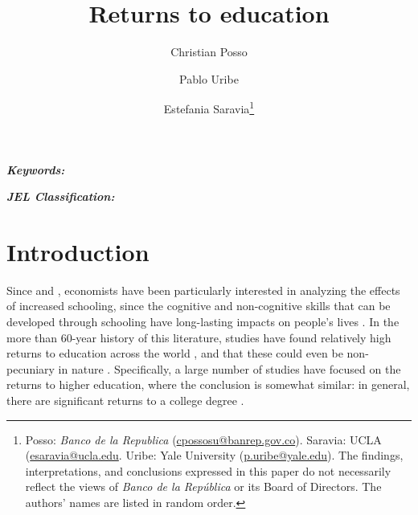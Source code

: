 \documentclass[12pt, a4paper]{article}
\begin{document}
\renewcommand{\BOthers}[1]{et al.\hbox{}}
\newcommand\fnote[1]{\captionsetup{font=small}\caption*{#1}}

\title{\Large \textbf{Returns to education} \vspace{-0.1cm}}
\author{Christian Posso \and Pablo Uribe \and Estefania Saravia\thanks{Posso: \textit{Banco de la Republica} (\href{mailto:cpossosu@banrep.gov.co}{cpossosu@banrep.gov.co}). Saravia: UCLA (\href{mailto:esaravia@ucla.edu}{esaravia@ucla.edu}. Uribe: Yale University (\href{mailto:p.uribe@yale.edu}{p.uribe@yale.edu}). The findings, interpretations, and conclusions expressed in this paper do not necessarily reflect the views of \textit{Banco de la República} or its Board of Directors. The authors’ names are listed in random order.}}
\maketitle

\vspace{-0.5cm}
\begin{abstract}
    
\end{abstract}



\textit{\textbf{Keywords:}} 



\textit{\textbf{JEL Classification:}}

\vspace{.5cm}

\newpage
\section{Introduction}

Since \citet{becker1962investment} and \citet{mincer1974schooling}, economists have been particularly interested in analyzing the effects of increased schooling, since the cognitive and non-cognitive skills that can be developed through schooling have long-lasting impacts on people's lives \citep{heckman2006effects}. In the more than 60-year history of this literature, studies have found relatively high returns to education across the world \citep{psacharopoulos2018returns}, and that these could even be non-pecuniary in nature \citep{oreopoulos2011priceless}. Specifically, a large number of studies have focused on the returns to higher education, where the conclusion is somewhat similar: in general, there are significant returns to a college degree \citep{oreopoulos2013making}. 
\end{document}
